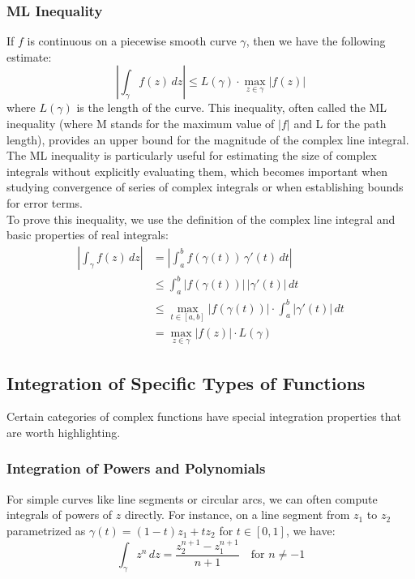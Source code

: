\subsubsection*{ML Inequality} 

\noindent If $f$ is continuous on a piecewise smooth curve $\gamma$, then we have the following estimate:
\[
\left| \int_{\gamma} f(z) \, dz \right| \leq L(\gamma) \cdot \max_{z \in \gamma} |f(z)|
\]
where $L(\gamma)$ is the length of the curve. This inequality, often called the ML inequality (where M stands for the maximum value of $|f|$ and L for the path length), provides an upper bound for the magnitude of the complex line integral. \\

\noindent The ML inequality is particularly useful for estimating the size of complex integrals without explicitly evaluating them, which becomes important when studying convergence of series of complex integrals or when establishing bounds for error terms. \\

\noindent To prove this inequality, we use the definition of the complex line integral and basic properties of real integrals:
\begin{align*}
\left| \int_{\gamma} f(z) \, dz \right| &= \left| \int_a^b f(\gamma(t)) \, \gamma'(t) \, dt \right| \\
&\leq \int_a^b |f(\gamma(t))| \, |\gamma'(t)| \, dt \\
&\leq \max_{t \in [a,b]} |f(\gamma(t))| \cdot \int_a^b |\gamma'(t)| \, dt \\
&= \max_{z \in \gamma} |f(z)| \cdot L(\gamma)
\end{align*}







\subsection*{Integration of Specific Types of Functions}

\noindent Certain categories of complex functions have special integration properties that are worth highlighting.

\subsubsection*{Integration of Powers and Polynomials}

\noindent For simple curves like line segments or circular arcs, we can often compute integrals of powers of $z$ directly. For instance, on a line segment from $z_1$ to $z_2$ parametrized as $\gamma(t) = (1-t)z_1 + tz_2$ for $t \in [0,1]$, we have:
\[
\int_{\gamma} z^n \, dz = \frac{z_2^{n+1} - z_1^{n+1}}{n+1} \quad \text{for } n \neq -1
\]

